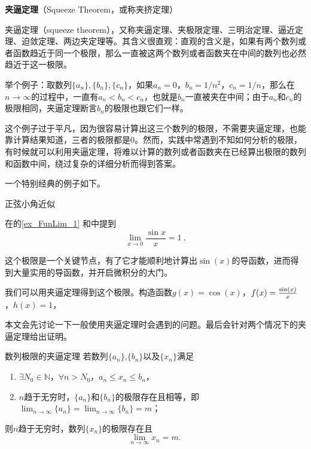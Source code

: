 
\begin{issues}
\issueDraft
\end{issues}
\textbf{夹逼定理}（Squeeze Theorem，或称夹挤定理）



夹逼定理（squeeze theorem），又称夹逼定理、夹极限定理、三明治定理、逼近定理、迫敛定理、两边夹定理等。其含义很直观：直观的含义是，如果有两个数列或者函数趋近于同一个极限，那么一直被这两个数列或者函数夹在中间的数列也必然趋近于这一极限。

举个例子：取数列$\{a_n\}, \{b_n\}, \{c_n\}$，如果$a_n=0$，$b_n=1/n^2$，$c_n=1/n$，那么在$n\to\infty$的过程中，一直有$a_n<b_n<c_n$，也就是$b_n$一直被夹在中间；由于$a_n$和$c_n$的极限相同，夹逼定理断言$b_n$的极限也跟它们一样。


这个例子过于平凡，因为很容易计算出这三个数列的极限，不需要夹逼定理，也能靠计算结果知道，三者的极限都是$0$。然而，实践中常遇到不知如何分析的极限，有时候就可以利用夹逼定理，将难以计算的数列或者函数夹在已经算出极限的数列和函数中间，绕过复杂的详细分析而得到答案。


一个特别经典的例子如下。

\begin{example}{正弦小角近似}

在的\autoref{ex_FunLim_1} 和中提到
\begin{equation}
\lim_{x\to 0}\frac{\sin x}{x}=1~. 
\end{equation}

这个极限是一个关键节点，有了它才能顺利地计算出$\sin(x)$的导函数，进而得到大量实用的导函数，并开启微积分的大门。


我们可以用夹逼定理得到这个极限。构造函数$g(x)=\cos(x)$，$f(x)={\sin(x)\over x}$，$h(x)=1$，



\end{example}








本文会先讨论一下一般使用夹逼定理时会遇到的问题。最后会针对两个情况下的夹逼定理给出证明。

\begin{theorem}{数列极限的夹逼定理}\label{the_SquzTh_1}
若数列$\{a_n\}$,$\{b_n\}$以及$\{x_n\}$满足
\begin{enumerate}
\item $\exists N_0\in \mathbb{N}$，$\forall n>N_0$，$a_n\leq x_n\leq b_n$，
\item $n$趋于无穷时，$\{a_n\}$和$\{b_n\}$的极限存在且相等，即$\lim_{n\to\infty}\{a_n\}=\lim_{n\to\infty}\{b_n\}=m$；
\end{enumerate}
则$n$趋于无穷时，数列$\{x_n\}$的极限存在且
\begin{equation}
\lim_{n\to\infty}x_n =m.~
\end{equation}
\end{theorem}

